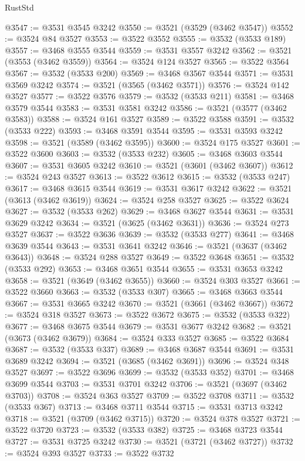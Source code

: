 \begin{lexlean}{RustStd}
\begin{coremodule}
@3547 := @3531 @3545 @3242
@3550 := @3521 (@3529 (@3462 @3547))
@3552 := @3524 @84 @3527
@3553 := @3522 @3552
@3555 := @3532 (@3533 @189)
@3557 := @3468 @3555 @3544
@3559 := @3531 @3557 @3242
@3562 := @3521 (@3553 (@3462 @3559))
@3564 := @3524 @124 @3527
@3565 := @3522 @3564
@3567 := @3532 (@3533 @200)
@3569 := @3468 @3567 @3544
@3571 := @3531 @3569 @3242
@3574 := @3521 (@3565 (@3462 @3571))
@3576 := @3524 @142 @3527
@3577 := @3522 @3576
@3579 := @3532 (@3533 @211)
@3581 := @3468 @3579 @3544
@3583 := @3531 @3581 @3242
@3586 := @3521 (@3577 (@3462 @3583))
@3588 := @3524 @161 @3527
@3589 := @3522 @3588
@3591 := @3532 (@3533 @222)
@3593 := @3468 @3591 @3544
@3595 := @3531 @3593 @3242
@3598 := @3521 (@3589 (@3462 @3595))
@3600 := @3524 @175 @3527
@3601 := @3522 @3600
@3603 := @3532 (@3533 @232)
@3605 := @3468 @3603 @3544
@3607 := @3531 @3605 @3242
@3610 := @3521 (@3601 (@3462 @3607))
@3612 := @3524 @243 @3527
@3613 := @3522 @3612
@3615 := @3532 (@3533 @247)
@3617 := @3468 @3615 @3544
@3619 := @3531 @3617 @3242
@3622 := @3521 (@3613 (@3462 @3619))
@3624 := @3524 @258 @3527
@3625 := @3522 @3624
@3627 := @3532 (@3533 @262)
@3629 := @3468 @3627 @3544
@3631 := @3531 @3629 @3242
@3634 := @3521 (@3625 (@3462 @3631))
@3636 := @3524 @273 @3527
@3637 := @3522 @3636
@3639 := @3532 (@3533 @277)
@3641 := @3468 @3639 @3544
@3643 := @3531 @3641 @3242
@3646 := @3521 (@3637 (@3462 @3643))
@3648 := @3524 @288 @3527
@3649 := @3522 @3648
@3651 := @3532 (@3533 @292)
@3653 := @3468 @3651 @3544
@3655 := @3531 @3653 @3242
@3658 := @3521 (@3649 (@3462 @3655))
@3660 := @3524 @303 @3527
@3661 := @3522 @3660
@3663 := @3532 (@3533 @307)
@3665 := @3468 @3663 @3544
@3667 := @3531 @3665 @3242
@3670 := @3521 (@3661 (@3462 @3667))
@3672 := @3524 @318 @3527
@3673 := @3522 @3672
@3675 := @3532 (@3533 @322)
@3677 := @3468 @3675 @3544
@3679 := @3531 @3677 @3242
@3682 := @3521 (@3673 (@3462 @3679))
@3684 := @3524 @333 @3527
@3685 := @3522 @3684
@3687 := @3532 (@3533 @337)
@3689 := @3468 @3687 @3544
@3691 := @3531 @3689 @3242
@3694 := @3521 (@3685 (@3462 @3691))
@3696 := @3524 @348 @3527
@3697 := @3522 @3696
@3699 := @3532 (@3533 @352)
@3701 := @3468 @3699 @3544
@3703 := @3531 @3701 @3242
@3706 := @3521 (@3697 (@3462 @3703))
@3708 := @3524 @363 @3527
@3709 := @3522 @3708
@3711 := @3532 (@3533 @367)
@3713 := @3468 @3711 @3544
@3715 := @3531 @3713 @3242
@3718 := @3521 (@3709 (@3462 @3715))
@3720 := @3524 @378 @3527
@3721 := @3522 @3720
@3723 := @3532 (@3533 @382)
@3725 := @3468 @3723 @3544
@3727 := @3531 @3725 @3242
@3730 := @3521 (@3721 (@3462 @3727))
@3732 := @3524 @393 @3527
@3733 := @3522 @3732

\end{coremodule}
\end{lexlean}
